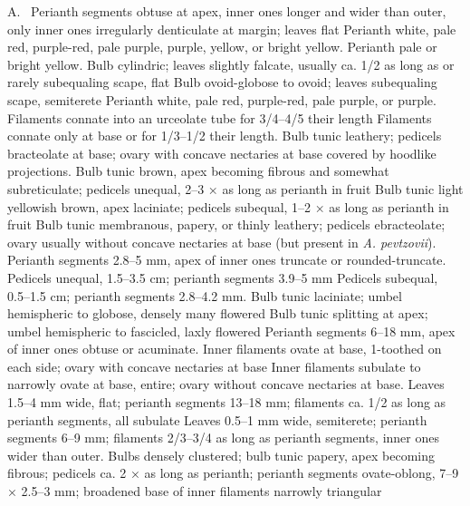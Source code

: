 \documentclass{ctexart}
\begin{document}
\begin{Key*}{A.~}
\alter Perianth segments obtuse at apex, inner ones longer and wider than outer, only inner ones irregularly denticulate at margin; leaves flat
\alter Perianth white, pale red, purple-red, pale purple, purple, yellow, or bright yellow.
\alter Perianth pale or bright yellow.
\alter Bulb cylindric; leaves slightly falcate, usually ca. 1/2 as long as or rarely subequaling scape, flat
\alter Bulb ovoid-globose to ovoid; leaves subequaling scape, semiterete
\alter Perianth white, pale red, purple-red, pale purple, or purple.
\alter Filaments connate into an urceolate tube for 3/4--4/5 their length
\alter Filaments connate only at base or for 1/3--1/2 their length.
\alter Bulb tunic leathery; pedicels bracteolate at base; ovary with concave nectaries at base covered by hoodlike projections.
\alter Bulb tunic brown, apex becoming fibrous and somewhat subreticulate; pedicels unequal, 2--3 × as long as perianth in fruit
\alter Bulb tunic light yellowish brown, apex laciniate; pedicels subequal, 1--2 × as long as perianth in fruit
\alter Bulb tunic membranous, papery, or thinly leathery; pedicels ebracteolate; ovary usually without concave nectaries at base (but present in \textit{A. pevtzovii}).
\alter Perianth segments 2.8--5 mm, apex of inner ones truncate or rounded-truncate.
\alter Pedicels unequal, 1.5--3.5 cm; perianth segments 3.9--5 mm
\alter Pedicels subequal, 0.5--1.5 cm; perianth segments 2.8--4.2 mm.
\alter Bulb tunic laciniate; umbel hemispheric to globose, densely many flowered
\alter Bulb tunic splitting at apex; umbel hemispheric to fascicled, laxly flowered
\alter Perianth segments 6--18 mm, apex of inner ones obtuse or acuminate.
\alter Inner filaments ovate at base, 1-toothed on each side; ovary with concave nectaries at base
\alter Inner filaments subulate to narrowly ovate at base, entire; ovary without concave nectaries at base.
\alter Leaves 1.5--4 mm wide, flat; perianth segments 13--18 mm; filaments ca. 1/2 as long as perianth segments, all subulate
\alter Leaves 0.5--1 mm wide, semiterete; perianth segments 6--9 mm; filaments 2/3--3/4 as long as perianth segments, inner ones wider than outer.
\alter Bulbs densely clustered; bulb tunic papery, apex becoming fibrous; pedicels ca. 2 × as long as perianth; perianth segments ovate-oblong, 7--9 × 2.5--3 mm; broadened base of inner filaments narrowly triangular

\end{Key*}
\end{document}
